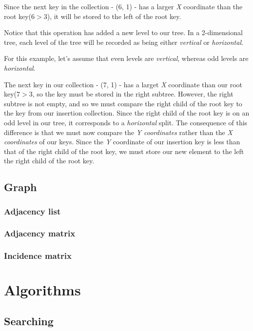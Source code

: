 \documentclass{article}
\begin{document}

Since the next key in the collection - (6, 1) - has a larger {\em X} coordinate than the root key(\(6 > 3\)), it will be stored to the left of the root key.

Notice that this operation has added a new level to our tree. In a 2-dimensional tree, each level of the tree will be recorded as being either {\em vertical} or {\em horizontal}.

For this example, let's assume that even levels are {\em vertical}, whereas odd levels are {\em horizontal}.

The next key in our collection - (7, 1) - has a larget {\em X} coordinate than our root key(\(7 > 3\), so the key must be stored in the right subtree. However, the right subtree is not empty, and so we must compare the right child of the root key to the key from our insertion collection. Since the right child of the root key is on an odd level in our tree, it corresponds to a {\em horizontal} split. The consequence of this difference is that we must now compare the {\em Y coordinates} rather than the {\em X coordinates} of our keys. Since the {\em Y} coordinate of our insertion key is less than that of the right child of the root key, we must store our new element to the left the right child of the root key.

\newpage

\subsection{Graph}

\subsubsection{Adjacency list}


\subsubsection{Adjacency matrix}
\subsubsection{Incidence matrix}


\newpage


\section{Algorithms}
\subsection{Searching}
\end{document}
